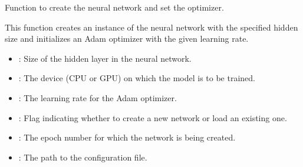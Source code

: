 \documentclass[letterpaper,10pt,english]{sphinxmanual}
\begin{document}
\begin{fulllineitems}
\begin{description}
\end{description}

\begin{fulllineitems}
\label{\detokenize{NetworkHelper:NetworkHelper.NetworkHelper.create_net_integ}}
\pysigstartsignatures
{}
\pysigstopsignatures
\sphinxAtStartPar
Function to create the neural network and set the optimizer.
\begin{description}
\sphinxAtStartPar
This function creates an instance of the  neural network with the specified
hidden size and initializes an Adam optimizer with the given learning rate.

\begin{itemize}
\item {} 
\sphinxAtStartPar
{}: Size of the hidden layer in the neural network.

\item {} 
\sphinxAtStartPar
{}: The device (CPU or GPU) on which the model is to be trained.

\item {} 
\sphinxAtStartPar
{}: The learning rate for the Adam optimizer.

\item {} 
\sphinxAtStartPar
{}: Flag indicating whether to create a new network or load an existing one.

\item {} 
\sphinxAtStartPar
{}: The epoch number for which the network is being created.

\item {} 
\sphinxAtStartPar
{}: The path to the configuration file.


\end{itemize}
\end{description}
\end{fulllineitems}
\end{fulllineitems}
\end{document}
